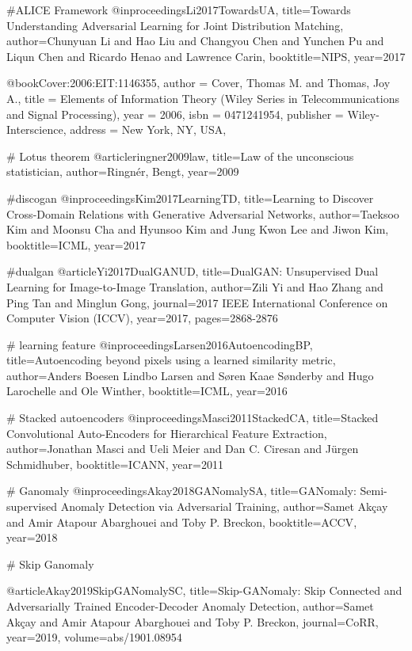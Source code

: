 #ALICE Framework
@inproceedings{Li2017TowardsUA,
  title={Towards Understanding Adversarial Learning for Joint Distribution Matching},
  author={Chunyuan Li and Hao Liu and Changyou Chen and Yunchen Pu and Liqun Chen and Ricardo Henao and Lawrence Carin},
  booktitle={NIPS},
  year={2017}
}

@book{Cover:2006:EIT:1146355,
 author = {Cover, Thomas M. and Thomas, Joy A.},
 title = {Elements of Information Theory (Wiley Series in Telecommunications and Signal Processing)},
 year = {2006},
 isbn = {0471241954},
 publisher = {Wiley-Interscience},
 address = {New York, NY, USA},
} 

# Lotus theorem
@article{ringner2009law,
  title={Law of the unconscious statistician},
  author={Ringn{\'e}r, Bengt},
  year={2009}
}

  #discogan
  @inproceedings{Kim2017LearningTD,
  title={Learning to Discover Cross-Domain Relations with Generative Adversarial Networks},
  author={Taeksoo Kim and Moonsu Cha and Hyunsoo Kim and Jung Kwon Lee and Jiwon Kim},
  booktitle={ICML},
  year={2017}
}

#dualgan 
@article{Yi2017DualGANUD,
  title={DualGAN: Unsupervised Dual Learning for Image-to-Image Translation},
  author={Zili Yi and Hao Zhang and Ping Tan and Minglun Gong},
  journal={2017 IEEE International Conference on Computer Vision (ICCV)},
  year={2017},
  pages={2868-2876}
}

# learning feature
@inproceedings{Larsen2016AutoencodingBP,
  title={Autoencoding beyond pixels using a learned similarity metric},
  author={Anders Boesen Lindbo Larsen and S{\o}ren Kaae S{\o}nderby and Hugo Larochelle and Ole Winther},
  booktitle={ICML},
  year={2016}
}

# Stacked autoencoders
@inproceedings{Masci2011StackedCA,
  title={Stacked Convolutional Auto-Encoders for Hierarchical Feature Extraction},
  author={Jonathan Masci and Ueli Meier and Dan C. Ciresan and J{\"u}rgen Schmidhuber},
  booktitle={ICANN},
  year={2011}
}


# Ganomaly 
@inproceedings{Akay2018GANomalySA,
  title={GANomaly: Semi-supervised Anomaly Detection via Adversarial Training},
  author={Samet Akçay and Amir Atapour Abarghouei and Toby P. Breckon},
  booktitle={ACCV},
  year={2018}
}

# Skip Ganomaly

@article{Akay2019SkipGANomalySC,
  title={Skip-GANomaly: Skip Connected and Adversarially Trained Encoder-Decoder Anomaly Detection},
  author={Samet Akçay and Amir Atapour Abarghouei and Toby P. Breckon},
  journal={CoRR},
  year={2019},
  volume={abs/1901.08954}
}

